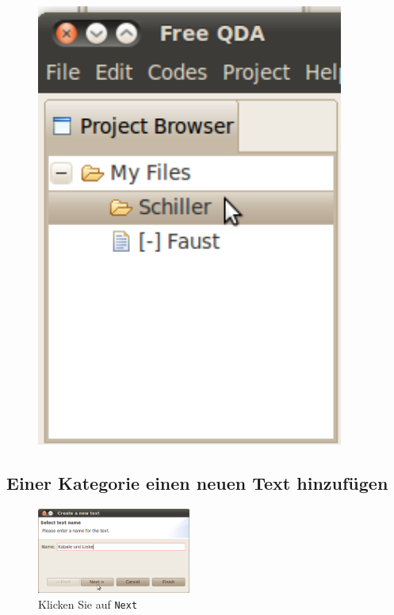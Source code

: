 \begin{figure}[!hbt]
\begin{minipage}[!hb!]{0.15\textwidth}
	 \includegraphics[width=0.9\textwidth]{img/newcategory2}
	\label{fig:newcategory2}
\end{minipage}
\end{figure}


\subsection{Einer Kategorie einen neuen Text hinzufügen}
\begin{figure}
 \vspace{-28pt}
 \begin{center}
    \includegraphics[width=0.45\textwidth]{img/createnewtext3}
  \end{center}
 
	\caption{Klicken Sie auf \texttt{Next}}
	\label{fig:newtext3}
  \vspace{12pt}
\end{figure}

